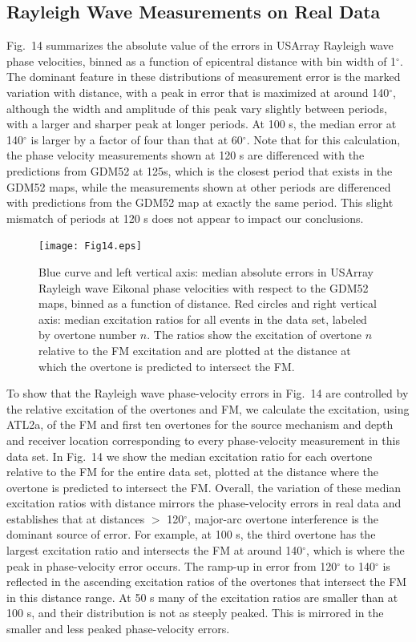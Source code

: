 \documentclass[extra,mreferee]{gji}
\begin{document}
 \subsection{Rayleigh Wave Measurements on Real Data}

Fig.\ 14 summarizes the absolute value of the errors in USArray Rayleigh wave phase velocities, binned as a function of epicentral distance with bin width of 1$^\circ$. The dominant feature in these distributions of measurement error is the marked variation with distance, with a peak in error that is maximized at around 140$^\circ$, although the width and amplitude of this peak vary slightly between periods, with a larger and sharper peak at longer periods. At 100 s, the median error at 140$^\circ$ is larger by a factor of four than that at 60$^\circ$. Note that for this calculation, the phase velocity measurements shown at 120 s are differenced with the predictions from GDM52 at 125s, which is the closest period that exists in the GDM52 maps, while the measurements shown at other periods are differenced with predictions from the GDM52 map at exactly the same period. This slight mismatch of periods at 120 s does not appear to impact our conclusions.

\begin{figure}
\texttt{[image: Fig14.eps]}
\caption{Blue curve and left vertical axis: median absolute errors in USArray Rayleigh wave Eikonal phase velocities with respect to the GDM52 maps, binned as a function of distance. Red circles and right vertical axis: median excitation ratios for all events in the data set, labeled by overtone number $n$. The ratios show the excitation of overtone $n$ relative to the FM excitation and are plotted at the distance at which the overtone is predicted to intersect the FM. }
\end{figure}

To show that the Rayleigh wave phase-velocity errors in Fig.\ 14 are controlled by the relative excitation of the overtones and FM, we calculate the excitation, using ATL2a, of the FM and first ten overtones for the source mechanism and depth and receiver location corresponding to every phase-velocity measurement in this data set. In Fig.\ 14 we show the median excitation ratio for each overtone relative to the FM for the entire data set, plotted at the distance where the overtone is predicted to intersect the FM. Overall, the variation of these median excitation ratios with distance mirrors the phase-velocity errors in real data and establishes that at distances $>$ 120$^\circ$, major-arc overtone interference is the dominant source of error. For example, at 100 s, the third overtone has the largest excitation ratio and intersects the FM at around 140$^\circ$, which is where the peak in phase-velocity error occurs. The ramp-up in error from 120$^\circ$ to 140$^\circ$ is reflected in the ascending excitation ratios of the overtones that intersect the FM in this distance range. At 50 s many of the excitation ratios are smaller than at 100 s, and their distribution is not as steeply peaked. This is mirrored in the smaller and less peaked phase-velocity errors.
\end{document}
